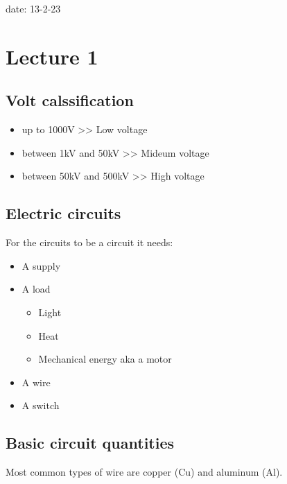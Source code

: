 \documentclass[11pt]{article}
\author{Yahia Gaber}
\date{\today}
\title{}
\begin{document}
\tableofcontents

date: 13-2-23
\section{Lecture 1}
\label{sec:orge89a20d}

\subsection{Volt calssification}
\label{sec:org99725ad}

\begin{itemize}
\item up to 1000V            >> Low voltage

\item between 1kV and 50kV   >> Mideum voltage

\item between 50kV and 500kV >> High voltage
\end{itemize}
\subsection{Electric circuits}
\label{sec:orgc0596e9}

For the circuits to be a circuit it needs:

\begin{itemize}
\item A supply

\item A load

\begin{itemize}
\item Light

\item Heat

\item Mechanical energy aka a motor
\end{itemize}

\item A wire

\item A switch
\end{itemize}
\subsection{Basic circuit quantities}
\label{sec:org50e57b8}

Most common types of wire are copper (Cu) and aluminum (Al).
\end{document}
